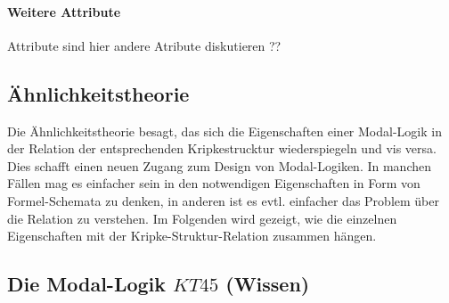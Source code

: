 \paragraph{Weitere Attribute} %
\label{par:weitere_attribute} Attribute sind hier andere Atribute diskutieren ??


\subsection{Ähnlichkeitstheorie} %
\label{sub:Aehnlichkeitstheorie}
Die Ähnlichkeitstheorie besagt, das sich die Eigenschaften einer Modal-Logik in der Relation der entsprechenden Kripkestrucktur wiederspiegeln und vis versa. Dies schafft einen neuen Zugang zum Design von Modal-Logiken. In manchen Fällen mag es einfacher sein in den notwendigen Eigenschaften in Form von Formel-Schemata zu denken, in anderen ist es evtl. einfacher das Problem über die Relation zu verstehen. 
Im Folgenden wird gezeigt, wie die einzelnen Eigenschaften mit der Kripke-Struktur-Relation zusammen hängen.




\subsection{Die Modal-Logik $KT45$ (Wissen)} %
\label{sub:the_normal_modal_logic_s5_}

